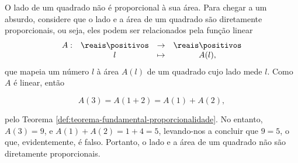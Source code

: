 \begin{solution}
  O lado de um quadrado não é proporcional à sua área.
  Para chegar a um absurdo, 
  considere que o lado e a área de um quadrado são diretamente proporcionais, ou seja, eles podem
  ser relacionados pela função linear
  \begin{equation*}
  \begin{array}{cccc}
    A : & \reais\positivos & \to     & \reais\positivos \\
        &  l & \mapsto & A(l),
  \end{array}
  \end{equation*}
  que mapeia um número $l$ à área $A(l)$ de um quadrado cujo lado mede $l$.
  Como $A$ é linear, então

  $$A(3) = A(1+2)=A(1)+A(2),$$

  \noindent pelo Teorema \ref{def:teorema-fundamental-proporcionalidade}. 
  No entanto, $A(3) = 9$, e $A(1)+A(2) = 1+4 = 5$, levando-nos a concluir que $9=5$, o que, evidentemente,
  é falso. Portanto, o lado e a área de um quadrado não são diretamente proporcionais.
\end{solution}